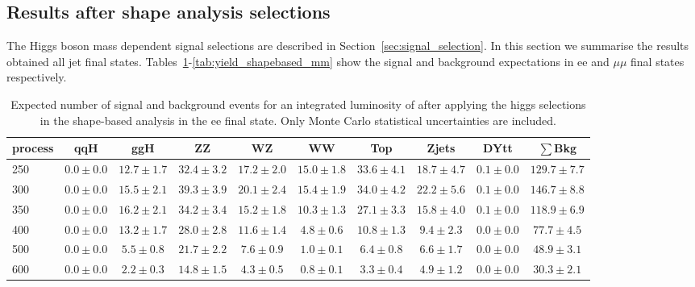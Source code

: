\subsection{Results after shape analysis selections}

The Higgs boson mass dependent signal selections are described in Section~\ref{sec:signal_selection}. 
In this section we summarise the results obtained all jet final states. 
Tables~\ref{tab:yield_shapebased_ee}-\ref{tab:yield_shapebased_mm} show the signal %
and background expectations in ee and $\mu\mu$ final states respectively. 

\begin{table}
{\footnotesize
 \begin{center}
 \begin{tabular}{l | c c | c c c c c c c }
 \hline
 process & qqH & ggH & ZZ & WZ & WW & Top & Zjets & DYtt & $\sum$Bkg \\
 \hline
250 & $0.0\pm0.0$ & $12.7\pm1.7$ & $32.4\pm3.2$ & $17.2\pm2.0$ & $15.0\pm1.8$ & $33.6\pm4.1$ & $18.7\pm4.7$ & $0.1\pm0.0$ & $129.7\pm7.7$ \\
300 & $0.0\pm0.0$ & $15.5\pm2.1$ & $39.3\pm3.9$ & $20.1\pm2.4$ & $15.4\pm1.9$ & $34.0\pm4.2$ & $22.2\pm5.6$ & $0.1\pm0.0$ & $146.7\pm8.8$ \\
350 & $0.0\pm0.0$ & $16.2\pm2.1$ & $34.2\pm3.4$ & $15.2\pm1.8$ & $10.3\pm1.3$ & $27.1\pm3.3$ & $15.8\pm4.0$ & $0.1\pm0.0$ & $118.9\pm6.9$ \\
400 & $0.0\pm0.0$ & $13.2\pm1.7$ & $28.0\pm2.8$ & $11.6\pm1.4$ & $4.8\pm0.6$ & $10.8\pm1.3$ & $9.4\pm2.3$ & $0.0\pm0.0$ & $77.7\pm4.5$ \\
500 & $0.0\pm0.0$ & $5.5\pm0.8$ & $21.7\pm2.2$ & $7.6\pm0.9$ & $1.0\pm0.1$ & $6.4\pm0.8$ & $6.6\pm1.7$ & $0.0\pm0.0$ & $48.9\pm3.1$ \\
600 & $0.0\pm0.0$ & $2.2\pm0.3$ & $14.8\pm1.5$ & $4.3\pm0.5$ & $0.8\pm0.1$ & $3.3\pm0.4$ & $4.9\pm1.2$ & $0.0\pm0.0$ & $30.3\pm2.1$ \\
\hline
\end{tabular}
\end{center}
\label{tab:yield_shapebased_ee}
}
\caption{\fixme Expected number of signal and background events for an 
  integrated luminosity of \intlumi after applying the higgs selections in the shape-based analysis in the ee final state. 
  Only Monte Carlo statistical uncertainties are included. }

\end{table}
